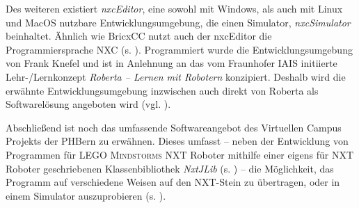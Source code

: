 \documentclass[paper=a4, DIV=calc, BCOR=15mm, twoside=on, onecolumn=on, open = right, titlepage =on, parskip =half, headsepline = on, footsepline = on, chapterprefix = off, appendixprefix = off, fontsize = 12pt, numbers = noenddot, abstract = on]{scrbook}
\begin{document}
Des weiteren existiert \emph{nxcEditor}, eine sowohl mit Windows, als auch mit Linux und \mbox{MacOS} nutzbare Entwicklungsumgebung, die einen Simulator, \emph{nxcSimulator} beinhaltet. Ähnlich wie BricxCC nutzt auch der nxcEditor die Programmiersprache NXC (s. \cite{nxceditor}). Programmiert wurde die Entwicklungsumgebung von Frank Knefel und ist in Anlehnung an das vom Fraunhofer IAIS initiierte Lehr-/Lernkonzept \emph{Roberta -- Lernen mit Robotern} konzipiert. Deshalb wird die erwähnte Entwicklungsumgebung inzwischen auch direkt von Roberta als Softwarelösung angeboten wird (vgl. \cite{roberta}).

Abschließend ist noch das umfassende Softwareangebot des Virtuellen Campus Projekts der PHBern zu erwähnen. Dieses umfasst -- neben der Entwicklung von Programmen für \textsc{LEGO Mindstorms} NXT Roboter mithilfe einer eigens für NXT Roboter geschriebenen Klassenbibliothek \emph{NxtJLib} (s. \cite{aegidius:16}) -- die Möglichkeit, das Programm auf verschiedene Weisen auf den NXT-Stein zu übertragen, oder in einem Simulator auszuprobieren (s. \cite{phbern}). 

\par \singlespacing
\end{document}
